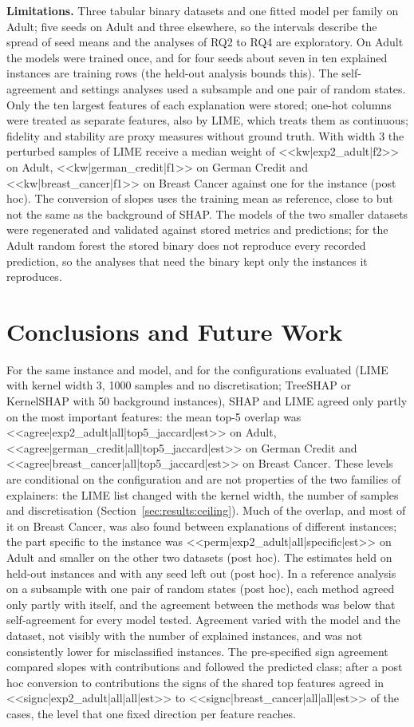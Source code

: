 \textbf{Limitations.} Three tabular binary datasets and one fitted model per family on
Adult; five seeds on Adult and three elsewhere, so the intervals describe the spread of seed
means and the analyses of RQ2 to RQ4 are exploratory. On Adult the models were trained once,
and for four seeds about seven in ten explained instances are training rows (the held-out
analysis bounds this). The self-agreement and settings analyses used a subsample and one pair
of random states. Only the ten largest features of each explanation were stored; one-hot
columns were treated as separate features, also by LIME, which treats them as continuous;
fidelity and stability are proxy measures without ground truth. With width 3 the perturbed
samples of LIME receive a median weight of <<kw|exp2_adult|f2>> on Adult,
<<kw|german_credit|f1>> on German Credit and <<kw|breast_cancer|f1>> on Breast Cancer against
one for the instance (post hoc). The conversion of slopes uses the training mean as
reference, close to but not the same as the background of SHAP. The models of the two
smaller datasets were regenerated and validated against stored metrics and predictions; for
the Adult random forest the stored binary does not reproduce every recorded prediction, so
the analyses that need the binary kept only the instances it reproduces.

\section{Conclusions and Future Work}
\label{sec:conclusions}

For the same instance and model, and for the configurations evaluated (LIME with kernel
width 3, 1000 samples and no discretisation; TreeSHAP or KernelSHAP with 50 background
instances), SHAP and LIME agreed only partly on the most important features: the mean top-5
overlap was <<agree|exp2_adult|all|top5_jaccard|est>> on Adult,
<<agree|german_credit|all|top5_jaccard|est>> on German Credit and
<<agree|breast_cancer|all|top5_jaccard|est>> on Breast Cancer. These levels are conditional
on the configuration and are not properties of the two families of explainers: the LIME
list changed with the kernel width, the number of samples and discretisation
(Section~\ref{sec:results:ceiling}). Much of the overlap, and most of it on Breast Cancer,
was also found between explanations of different instances; the part specific to the
instance was <<perm|exp2_adult|all|specific|est>> on Adult and smaller on the other two
datasets (post hoc). The estimates held on held-out instances and with any seed left out
(post hoc). In a reference analysis on a subsample with one pair of random states (post
hoc), each method agreed only partly with itself, and the agreement between the methods was
below that self-agreement for every model tested. Agreement varied with the model and the
dataset, not visibly with the number of explained instances, and was not consistently lower
for misclassified instances. The pre-specified sign agreement compared slopes with
contributions and followed the predicted class; after a post hoc conversion to
contributions the signs of the shared top features agreed in
<<signc|exp2_adult|all|all|est>> to <<signc|breast_cancer|all|all|est>> of the cases, the
level that one fixed direction per feature reaches.

